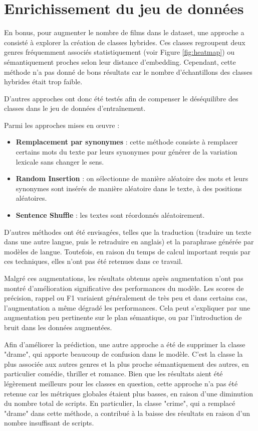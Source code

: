 \documentclass[12pt]{report}
\begin{document}
\section{Enrichissement du jeu de données}

En bonus, pour augmenter le nombre de films dans le dataset, une approche a consisté à explorer la création de classes hybrides. Ces classes regroupent deux genres fréquemment associés statistiquement (voir Figure \ref{fig:heatmap}) ou sémantiquement proches selon leur distance d'embedding. Cependant, cette méthode n’a pas donné de bons résultats car le nombre d'échantillons des classes hybrides était trop faible. 

 

D'autres approches ont donc été testés afin de compenser le déséquilibre des classes dans le jeu de données d'entraînement. 

Parmi les approches mises en œuvre : 

\begin{itemize}
    \item \textbf{Remplacement par synonymes} : cette méthode consiste à remplacer certains mots du texte par leurs synonymes pour générer de la variation lexicale sans changer le sens.
    \item \textbf{Random Insertion} : on sélectionne de manière aléatoire des mots et leurs synonymes sont insérés de manière aléatoire dans le texte, à des positions aléatoires.
    \item \textbf{Sentence Shuffle} : les textes sont réordonnés aléatoirement.
\end{itemize}


D'autres méthodes ont été envisagées, telles que la traduction (traduire un texte dans une autre langue, puis le retraduire en anglais) et la paraphrase générée par modèles de langue. Toutefois, en raison du temps de calcul important requis par ces techniques, elles n’ont pas été retenues dans ce travail. 

Malgré ces augmentations, les résultats obtenus après augmentation n’ont pas montré d'amélioration significative des performances du modèle. Les scores de précision, rappel ou F1 variaient généralement de très peu et dans certains cas, l'augmentation a même dégradé les performances. Cela peut s'expliquer par une augmentation peu pertinente sur le plan sémantique, ou par l’introduction de bruit dans les données augmentées. 

Afin d’améliorer la prédiction, une autre approche a été de supprimer la classe "drame", qui apporte beaucoup de confusion dans le modèle. C’est la classe la plus associée aux autres genres et la plus proche sémantiquement des autres, en particulier comédie, thriller et romance. Bien que les résultats aient été légèrement meilleurs pour les classes en question, cette approche n’a pas été retenue car les métriques globales étaient plus basses, en raison d'une diminution du nombre total de scripts. En particulier, la classe "crime", qui a remplacé "drame" dans cette méthode, a contribué à la baisse des résultats en raison d'un nombre insuffisant de scripts. 
\end{document}
